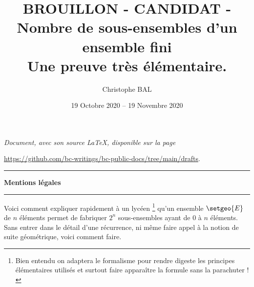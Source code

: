 \documentclass[12pt]{amsart}
\begin{document}
\title{BROUILLON - CANDIDAT - Nombre de sous-ensembles d'un ensemble fini\\Une preuve très élémentaire.}
\author{Christophe BAL}
\date{19 Octobre 2020 -- 19 Novembre 2020}


\maketitle

\begin{center}
	\itshape
	Document, avec son source \LaTeX, disponible sur la page

	\url{https://github.com/bc-writings/bc-public-docs/tree/main/drafts}.
\end{center}


\bigskip


\begin{center}
	\hrule\vspace{.3em}
	{
		\fontsize{1.35em}{1em}\selectfont
		\textbf{Mentions \og légales \fg}
	}

	\vspace{0.45em}
	\doclicenseThis
	\hrule
\end{center}


\bigskip



Voici comment expliquer rapidement à un lycéen
\footnote{
	Bien entendu on adaptera le formalisme pour rendre digeste les principes élémentaires utilisés et surtout faire apparaître la formule sans la parachuter !
}
qu'un ensemble $\setgeo{E}$ de $n$ éléments permet de fabriquer $2^n$ sous-ensembles ayant de $0$ à $n$ éléments. Sans entrer dans le détail d'une récurrence, ni même faire appel à la notion de suite géométrique, voici comment faire.
\end{document}
